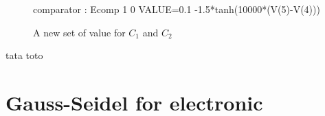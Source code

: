 \begin{figure}[!h]
comparator : Ecomp 1 0 VALUE={0.1 -1.5*tanh(10000*(V(5)-V(4)))}
\begin{center}
\end{center}
\end{figure}
\begin{figure}[!h]
A new set of value for $C_{1}$ and $C_{2}$
\begin{center}
\end{center}
\end{figure}
tata
\newpage
toto
\newpage
\section{Gauss-Seidel for electronic}

